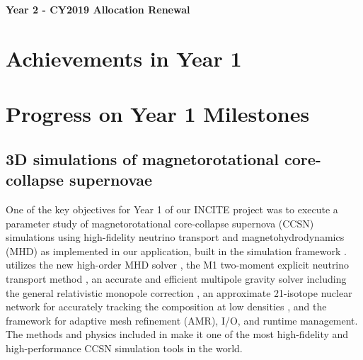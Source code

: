 \documentclass[12pt]{article}
\begin{document}
\begin{center}
  {\bf Year 2 - CY2019 Allocation Renewal} \vspace{-0.1in}
\end{center}

\section*{Achievements in Year 1}

\section{Progress on Year 1 Milestones}

\subsection{3D simulations of magnetorotational core-collapse supernovae}

One of the key objectives for Year 1 of our INCITE project was to execute a parameter study of magnetorotational core-collapse supernova (CCSN) simulations using high-fidelity neutrino transport and magnetohydrodynamics (MHD) as implemented in our \sparkmone application, built in the \flash simulation framework \citep{Fryxell:2000, Dubey:2009}.
\sparkmone utilizes the new \spark high-order MHD solver \citep{couch:2017}, the M1 two-moment explicit neutrino transport method \citep{Shibata:2011a, oconnor:2015, oconnor:2018}, an accurate and efficient multipole gravity solver \citep{couch:2013c} including the general relativistic monopole correction \citep{Marek:2006}, an approximate 21-isotope nuclear network for accurately tracking the composition at low densities \citep{couch:2015a}, and the \flash framework for adaptive mesh refinement (AMR), I/O, and runtime management.
The methods and physics included in \sparkmone make it one of the most high-fidelity and high-performance CCSN simulation tools in the world.
\end{document}

